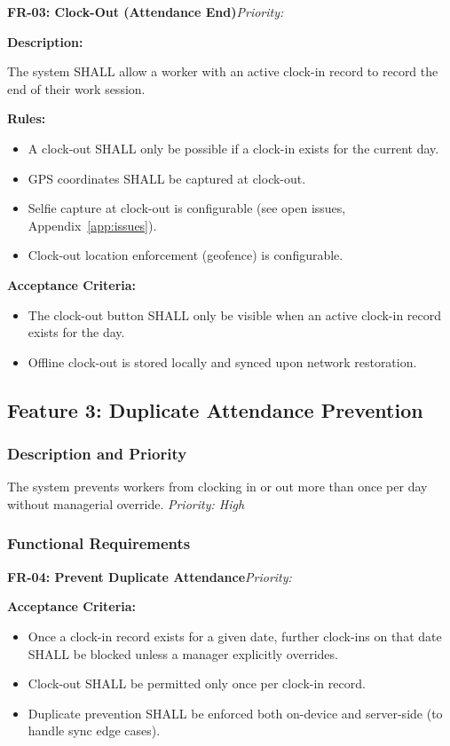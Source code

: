 \documentclass[12pt, a4paper]{article}
\newcommand{\frblock}[2]{%
    \noindent\textbf{#1}\hfill\textit{Priority: #2}%
    \par\smallskip%
}
\newcommand{\srsfield}[1]{\noindent\textbf{#1:}\par}
\begin{document}
\bigskip
\frblock{FR-03: Clock-Out (Attendance End)}{}

\srsfield{Description}
The system SHALL allow a worker with an active clock-in record to record
the end of their work session.

\srsfield{Rules}
\begin{itemize}
    \item A clock-out SHALL only be possible if a clock-in exists for
          the current day.
    \item GPS coordinates SHALL be captured at clock-out.
    \item Selfie capture at clock-out is configurable (see open issues,
          Appendix~\ref{app:issues}).
    \item Clock-out location enforcement (geofence) is configurable.
\end{itemize}

\srsfield{Acceptance Criteria}
\begin{itemize}
    \item The clock-out button SHALL only be visible when an active
          clock-in record exists for the day.
    \item Offline clock-out is stored locally and synced upon
          network restoration.
\end{itemize}

\subsection{Feature 3: Duplicate Attendance Prevention}

\subsubsection*{Description and Priority}
The system prevents workers from clocking in or out more than once per
day without managerial override.
\hfill \textit{Priority: High}

\subsubsection*{Functional Requirements}

\frblock{FR-04: Prevent Duplicate Attendance}{}

\srsfield{Acceptance Criteria}
\begin{itemize}
    \item Once a clock-in record exists for a given date, further
          clock-ins on that date SHALL be blocked unless a manager
          explicitly overrides.
    \item Clock-out SHALL be permitted only once per clock-in record.
    \item Duplicate prevention SHALL be enforced both on-device and
          server-side (to handle sync edge cases).
\end{itemize}
\end{document}
